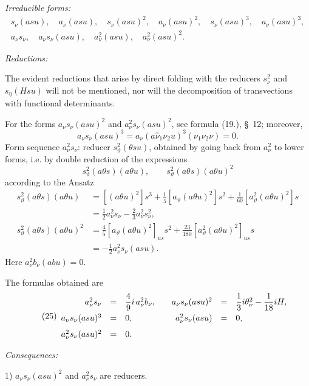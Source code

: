 \documentclass[11pt]{article}
\begin{document}
\noindent\emph{Irreducible forms:}
\[
\begin{gathered}
s_\nu(asu),\quad a_\nu(asu),\quad s_\nu(asu)^2,\quad a_\nu(asu)^2,
\quad s_\nu(asu)^3,\quad a_\nu(asu)^3,\\
a_\nu s_\nu,
\quad a_\nu s_\nu(asu),
\quad a_\nu^2(asu),
\quad a_\nu^2(asu)^2.
\end{gathered}
\]

\noindent\emph{Reductions:}

The evident reductions that arise by direct folding with the reducers $s_\nu^2$ and $s_\eta(Hsu)$ will not be mentioned, nor will the decomposition of transvections with functional determinants.

For the forms $a_\nu s_\nu(asu)^2$ and $a_\nu^2s_\nu(asu)^2$, see formula (19.), \S\ 12; moreover,
\[
 a_\nu s_\nu(asu)^3=a_\nu(a\widehat{\nu}_1\nu_2u)^3(\nu_1\nu_2\nu)=0.
\]
Form sequence $a_\nu^2s_\nu$: reducer $s_\vartheta^2(\theta su)$, obtained by going back from $a_\nu^2$ to lower forms, i.e. by double reduction of the expressions
\[
 s_\vartheta^2(a\theta s)(a\theta u),
 \qquad s_\vartheta^2(a\theta s)(a\theta u)^2
\]
according to the Ansatz
\[
\begin{aligned}
s_\vartheta^2(a\theta s)(a\theta u)
&=[(a\theta u)^2]s^3+\frac15[a_\vartheta(a\theta u)^2]s^2+\frac1{60}[a_\vartheta^2(a\theta u)^2]s\\
&=\frac12a_\nu^2s_\nu-\frac23a_\nu^2s_\nu^2,\\
s_\vartheta^2(a\theta s)(a\theta u)^2
&=\frac45[a_\vartheta(a\theta u)^2]_{us}s^2+\frac{23}{180}[a_\vartheta^2(a\theta u)^2]_{us}s\\
&=-\frac12a_\nu^2s_\nu(asu).
\end{aligned}
\]
Here $a_\nu^2b_\nu(abu)=0$.

The formulas obtained are
\[
\tag{25}
\begin{array}{rcl@{\qquad}rcl}
a_\nu^2s_\nu&=&\dfrac49i\,a_\nu^2b_\nu,
& a_\nu s_\nu(asu)^2&=&\dfrac13i\theta_\nu^2-\dfrac1{18}iH,\\[0.7em]
a_\nu s_\nu(asu)^3&=&0,
& a_\nu^2s_\nu(asu)&=&0,\\[0.7em]
a_\nu^2s_\nu(asu)^2&=&0.
\end{array}
\]

\noindent\emph{Consequences:}

1) $a_\nu s_\nu(asu)^2$ and $a_\nu^2s_\nu$ are reducers.
\end{document}
